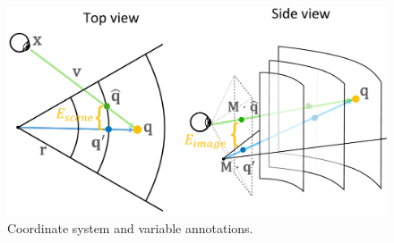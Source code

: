 \begin{figure}
    \centering
    \includegraphics[width=0.96\linewidth]{TOG/figs/parameters.pdf}
    
    \caption{Coordinate system and variable annotations.}
    \label{fig:notations}
\end{figure}